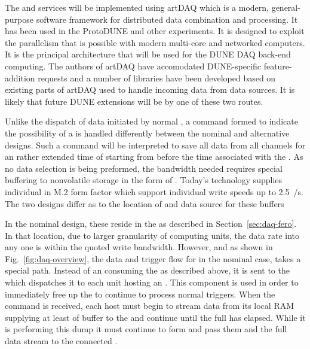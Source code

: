 The  and  services will be implemented using
artDAQ which is a modern, general-purpose software framework for
distributed data combination and processing. 
It has been used in the ProtoDUNE and other experiments.
It is designed to exploit the parallelism that is possible with
modern multi-core and networked computers. 
It is the principal architecture that will be used for the DUNE DAQ
back-end computing.
The authors of artDAQ have accomodated DUNE-specific feature-addition
requests and a number of libraries have been developed based on
existing parts of artDAQ used to handle incoming data from data
sources. 
It is likely that future DUNE extensions will be by one of these two
routes.

Unlike the dispatch of data initiated by normal ,
a command formed to indicate the possibility of a  is
handled differently between the nominal and alternative designs. 
Such a command will be interpreted to save all data from all channels
for an rather extended time of \snbtime starting from \snbpretime
before the time associated with the . 
As no data selection is being preformed, the bandwidth needed requires
special buffering to nonvolatile storage in the form of . 
Today's technology supplies individual  in M.2 form factor
which support individual write speeds up to \SI{2.5}{\GB/\s}. 
The two designs differ as to the location of and data source for these
buffers

In the nominal design, these  reside in the 
as described in Section~\ref{sec:daq-fero}. 
In that location, due to larger granularity of computing units, the
data rate into any one  is within the quoted write
bandwidth. 
However, and as shown in Fig.~\ref{fig:daq-overview}, the data and
trigger flow for  in the nominal case, takes a special
path. 
Instead of an  consuming the  as
described above, it is sent to the  which dispatches
it to each  unit hosting an . 
This component is used in order to immediately free up the 
to continue to process normal triggers.
When the command is received, each host must begin to stream data from
its local RAM supplying at least \snbpretime of buffer to the
 and continue until the full \snbtime has elapsed. 
While it is performing this dump it must continue to form
 and pass them and the full data stream to the
connected .

